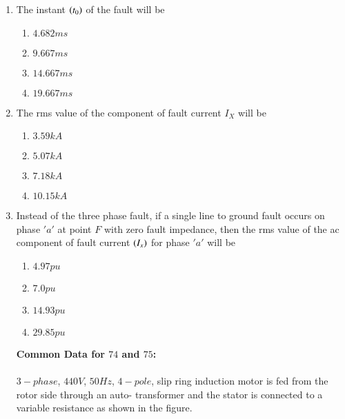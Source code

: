 \documentclass[journal]{IEEEtran}
\begin{document}
\begin{enumerate}
\item The instant $\left(t_0\right)$ of the fault will be 
\begin{enumerate}
    \item $4.682 ms$
    \item $9.667 ms$
    \item $14.667 ms$
    \item $19.667 ms$
\end{enumerate}
\item The rms value of the component of fault current $I_X$ will be 
\begin{enumerate}
    \item $3.59kA$ 
    \item $5.07kA$
    \item $7.18kA$
    \item $10.15kA$
\end{enumerate}
\item Instead of the three phase fault, if a single line to ground fault occurs on phase $'a'$ at point $F$ with zero fault impedance, then the rms value of the ac component of fault current $\left(I_x\right)$ for phase $'a'$ will be
\begin{enumerate}
    \item $4.97 pu$
    \item $7.0 pu$
    \item $14.93 pu$
    \item $29.85 pu$
\end{enumerate}
 \textbf{Common Data for $74$ and $75$:}\\\\
$3-phase$, $440 V$, $50 Hz$, $4-pole$, slip ring induction motor is fed from the rotor side through an auto- transformer and the stator is connected to a variable resistance as shown in the figure.\\\\\\\\\\\\\\\\


\end{enumerate}
\end{document}
